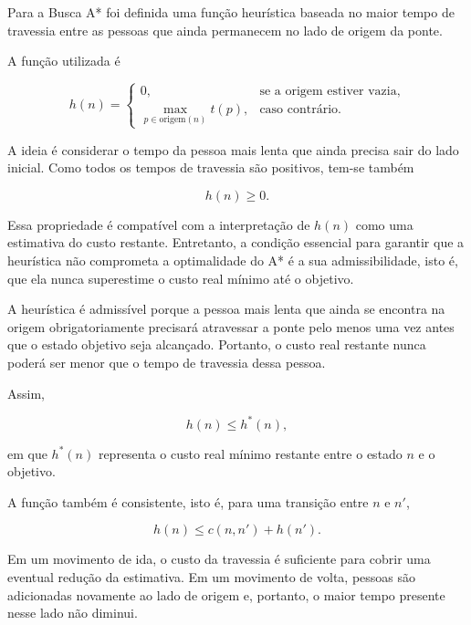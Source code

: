 \documentclass[12pt,a4paper]{article}
\begin{document}
Para a Busca A* foi definida uma função heurística baseada no maior tempo de
travessia entre as pessoas que ainda permanecem no lado de origem da ponte.

A função utilizada é

\[
h(n)=
\begin{cases}
0, & \text{se a origem estiver vazia},\\[2mm]
\displaystyle\max_{p\in \mathrm{origem}(n)} t(p),
& \text{caso contrário}.
\end{cases}
\]

A ideia é considerar o tempo da pessoa mais lenta que ainda precisa sair do
lado inicial. Como todos os tempos de travessia são positivos, tem-se também

\[
h(n)\geq 0.
\]

Essa propriedade é compatível com a interpretação de $h(n)$ como uma
estimativa do custo restante. Entretanto, a condição essencial para garantir
que a heurística não comprometa a optimalidade do A* é a sua admissibilidade,
isto é, que ela nunca superestime o custo real mínimo até o objetivo.

A heurística é admissível porque a pessoa mais lenta que ainda se encontra na
origem obrigatoriamente precisará atravessar a ponte pelo menos uma vez antes
que o estado objetivo seja alcançado. Portanto, o custo real restante nunca
poderá ser menor que o tempo de travessia dessa pessoa.

Assim,

\[
h(n) \leq h^*(n),
\]

em que $h^*(n)$ representa o custo real mínimo restante entre o estado $n$ e
o objetivo.

A função também é consistente, isto é, para uma transição entre $n$ e $n'$,

\[
h(n) \leq c(n,n') + h(n').
\]

Em um movimento de ida, o custo da travessia é suficiente para cobrir uma
eventual redução da estimativa. Em um movimento de volta, pessoas são
adicionadas novamente ao lado de origem e, portanto, o maior tempo presente
nesse lado não diminui.



\end{document}
